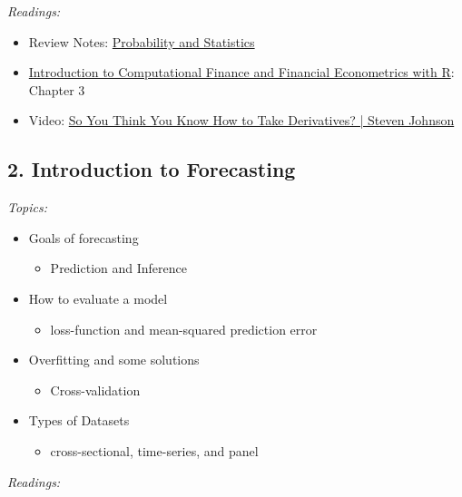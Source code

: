 \documentclass[12pt]{article}
\begin{document}
\bigskip
\noindent\emph{Readings:}

\begin{itemize}
  \item Review Notes: \href{https://nbviewer.org/github/kylebutts/UARK_5753/blob/main/00-Review_Probability_and_Statistics/Review_Probability_and_Statistics.pdf}{Probability and Statistics}

  \item \href{https://bookdown.org/compfinezbook/introcompfinr/Matrix-Algebra-Review.html}{Introduction to Computational Finance and Financial Econometrics with R}: Chapter 3

  \item Video: \href{https://www.youtube.com/watch?v=-l7JHalBubw}{So You Think You Know How to Take Derivatives? | Steven Johnson}
\end{itemize}


\subsection*{2. Introduction to Forecasting}

\noindent\emph{Topics:}

\begin{itemize}
  \item Goals of forecasting
  \begin{itemize}
    \item Prediction and Inference
  \end{itemize}

  \item How to evaluate a model
  \begin{itemize}
    \item loss-function and mean-squared prediction error
  \end{itemize}

  \item Overfitting and some solutions
  \begin{itemize}
    \item Cross-validation
  \end{itemize}

  \item Types of Datasets
  \begin{itemize}
    \item cross-sectional, time-series, and panel
  \end{itemize}
\end{itemize}

\bigskip
\noindent\emph{Readings:}
\end{document}
